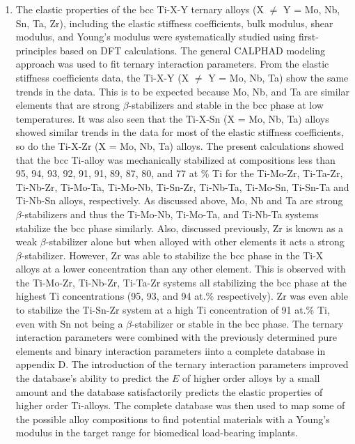 \begin{enumerate}
	\item The elastic properties of the bcc Ti-X-Y ternary alloys (X $\neq$ Y = Mo, Nb, Sn, Ta, Zr), including the elastic stiffness coefficients, bulk modulus, shear modulus, and Young's modulus were systematically studied using first-principles based on DFT calculations. The general CALPHAD modeling approach was used to fit ternary interaction parameters. From the elastic stiffness coefficients data, the Ti-X-Y (X $\neq$ Y = Mo, Nb, Ta) show the same trends in the data. This is to be expected because Mo, Nb, and Ta are similar elements that are strong $\beta$-stabilizers and stable in the bcc phase at low temperatures. It was also seen that the Ti-X-Sn (X = Mo, Nb, Ta) alloys showed similar trends in the data for most of the elastic stiffness coefficients, so do the Ti-X-Zr (X = Mo, Nb, Ta) alloys. The present calculations showed that the bcc Ti-alloy was mechanically stabilized at compositions less than 95, 94, 93, 92, 91, 91, 89, 87, 80, and 77 at \% Ti for the Ti-Mo-Zr, Ti-Ta-Zr, Ti-Nb-Zr, Ti-Mo-Ta, Ti-Mo-Nb, Ti-Sn-Zr, Ti-Nb-Ta, Ti-Mo-Sn, Ti-Sn-Ta and Ti-Nb-Sn alloys, respectively. As discussed above, Mo, Nb and Ta are strong $\beta$-stabilizers and thus the Ti-Mo-Nb, Ti-Mo-Ta, and Ti-Nb-Ta systems stabilize the bcc phase similarly. Also, discussed previously, Zr is known as a weak $\beta$-stabilizer alone but when alloyed with other elements it acts a strong $\beta$-stabilizer. However, Zr was able to stabilize the bcc phase in the Ti-X alloys at a lower concentration than any other element. This is observed with the Ti-Mo-Zr, Ti-Nb-Zr, Ti-Ta-Zr systems all stabilizing the bcc phase at the highest Ti concentrations (95, 93, and 94 at.\% respectively). Zr was even able to stabilize the Ti-Sn-Zr system at a high Ti concentration of 91 at.\% Ti, even with Sn not being a $\beta$-stabilizer or stable in the bcc phase. The ternary interaction parameters were combined with the previously determined pure elements and binary interaction parameters iinto a complete database in appendix D. The introduction of the ternary interaction parameters improved the database's ability to predict the $E$ of higher order alloys by a small amount and the database satisfactorily predicts the elastic properties of higher order Ti-alloys. The complete database was then used to map some of the possible alloy compositions to find potential materials with a Young's modulus in the target range for biomedical load-bearing implants. 

\end{enumerate}
